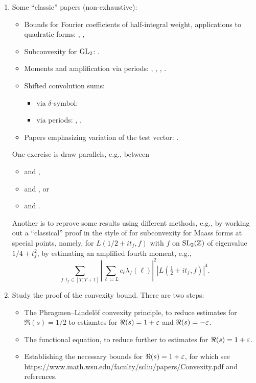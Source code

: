 \documentclass[reqno]{amsart} 
\begin{document}
\begin{enumerate}
\item Some ``classic'' papers (non-exhaustive):
  \begin{itemize}
  \item Bounds for Fourier coefficients of half-integral weight, applications to quadratic forms: \cite{MR870736}, \cite{MR931205}, \cite{MR1437494}
  \item Subconvexity for $\operatorname{GL}_2$: \cite{DFI93} \cite{DFI94} \cite{DFI01}.
  \item Moments and amplification via periods:  \cite{venkatesh-2005}, \cite{michel-2009}, \cite{iwan-sar}, \cite{MR780071}.
  \item Shifted convolution sums:
    \begin{itemize}
    \item via $\delta$-symbol: \cite{DFI93}
    \item via periods: \cite{Sar01}\cite{MR2437682}, \cite{2024arXiv2404.10692}.
    \end{itemize}
  \item Papers emphasizing variation of the test vector:   \cite{MR2373356, MR2726097, venkatesh-2005}.
  \end{itemize}
  One exercise is draw parallels, e.g., between
  \begin{itemize}
  \item \cite[Thm 5.1]{michel-2009} and \cite{DFI93},
  \item \cite[\S4]{venkatesh-2005} and \cite{DFI94}, or
  \item \cite[Thm 5.2]{michel-2009} and \cite{DFI01}.
  \end{itemize}
  Another is to reprove some results using different methods, e.g., by working out a ``classical'' proof in the style of \cite{DFI01} for subconvexity for Maass forms at special points, namely, for $L(1/2 + i t_f, f)$ with $f$ on $\operatorname{SL}_2(\mathbb{Z})$ of eigenvalue $1/4 + t_f^2$, by estimating an amplified fourth moment, e.g.,
  \begin{equation*}
    \sum_{f : t_f \in [T, T+1]}
    \left| \sum_{\ell \asymp L}
      c_{\ell}   \lambda_f(\ell)\right|^2
    \left| L(\tfrac{1}{2} + i t_f, f) \right|^4.    
  \end{equation*}

\item Study the proof of the convexity bound.  There are two steps:
  \begin{itemize}
  \item The Phragmen--Lindel\"{o}f convexity principle, to reduce estimates for $\Re(s) = 1/2$ to estiamtes for $\Re(s) = 1 + \varepsilon$ and $\Re(s) = - \varepsilon$.
  \item The functional equation, to reduce further to estimates for $\Re(s) = 1 + \varepsilon$.
  \item Establishing the necessary bounds for $\Re(s) = 1 + \varepsilon$, for which see \url{https://www.math.wsu.edu/faculty/scliu/papers/Convexity.pdf} and references.
  \end{itemize}


\end{enumerate}
\end{document}
